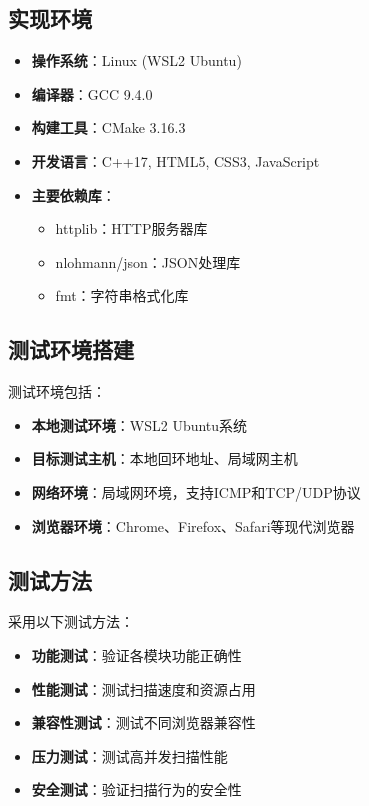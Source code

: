 \documentclass[12pt,hyperref,a4paper,UTF8]{ctexart}
\begin{document}
\subsection{实现环境}
\begin{itemize}
    \item \textbf{操作系统}：Linux (WSL2 Ubuntu)
    \item \textbf{编译器}：GCC 9.4.0
    \item \textbf{构建工具}：CMake 3.16.3
    \item \textbf{开发语言}：C++17, HTML5, CSS3, JavaScript
    \item \textbf{主要依赖库}：
    \begin{itemize}
        \item httplib：HTTP服务器库
        \item nlohmann/json：JSON处理库
        \item fmt：字符串格式化库
    \end{itemize}
\end{itemize}

\subsection{测试环境搭建}
测试环境包括：
\begin{itemize}
    \item \textbf{本地测试环境}：WSL2 Ubuntu系统
    \item \textbf{目标测试主机}：本地回环地址、局域网主机
    \item \textbf{网络环境}：局域网环境，支持ICMP和TCP/UDP协议
    \item \textbf{浏览器环境}：Chrome、Firefox、Safari等现代浏览器
\end{itemize}

\subsection{测试方法}
采用以下测试方法：
\begin{itemize}
    \item \textbf{功能测试}：验证各模块功能正确性
    \item \textbf{性能测试}：测试扫描速度和资源占用
    \item \textbf{兼容性测试}：测试不同浏览器兼容性
    \item \textbf{压力测试}：测试高并发扫描性能
    \item \textbf{安全测试}：验证扫描行为的安全性
\end{itemize}
\end{document}
